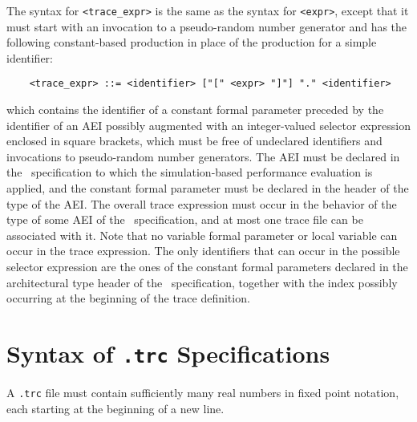 The syntax for {\tt <trace\_expr>} is the same as the syntax for {\tt <expr>}, except that it must start
with an invocation to a pseudo-random number generator and has the following constant-based production in
place of the production for a simple identifier:

        \begin{verbatim}
    <trace_expr> ::= <identifier> ["[" <expr> "]"] "." <identifier>
        \end{verbatim}

\noindent which contains the identifier of a constant formal parameter preceded by the identifier of an AEI
possibly augmented with an integer-valued selector expression enclosed in square brackets, which must be
free of undeclared identifiers and invocations to pseudo-random number generators. The AEI must be declared
in the \aemilia\ specification to which the simulation-based performance evaluation is applied, and the
constant formal parameter must be declared in the header of the type of the AEI. The overall trace
expression must occur in the behavior of the type of some AEI of the \aemilia\ specification, and at most
one trace file can be associated with it. Note that no variable formal parameter or local variable can occur
in the trace expression. The only identifiers that can occur in the possible selector expression are the
ones of the constant formal parameters declared in the architectural type header of the \aemilia\
specification, together with the index possibly occurring at the beginning of the trace definition.



\section{Syntax of {\tt .trc} Specifications}

A {\tt .trc} file must contain sufficiently many real numbers in fixed point notation, each starting at the
beginning of a new line.




